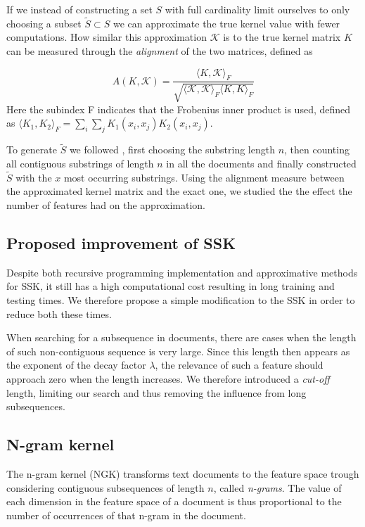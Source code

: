 If we instead of constructing a set $ S $ with full cardinality limit ourselves to only choosing a subset $ \tilde{S} \subset S $ we can approximate the true kernel value with fewer computations. How similar this approximation $ \mathcal{K} $ is to the true kernel matrix $ K $ can be measured through the \textit{alignment} of the two matrices, defined as

\begin{equation}\label{key}
A(K,\mathcal{K}) = \dfrac{\langle K, \mathcal{K}\rangle_{F}}{\sqrt{\langle \mathcal{K}, \mathcal{K}\rangle_{F} \langle K, K\rangle_{F} }}
\end{equation}
Here the subindex F indicates that the Frobenius inner product is used, defined as $ \langle K_1,K_2 \rangle_{F} = \sum_{i}\sum_{j}K_1(x_i,x_j)K_2(x_i,x_j) $.

To generate $ \tilde{S} $ we followed \cite{lodhi}, first choosing the substring length $ n $, then counting all contiguous substrings of length $ n $ in all the documents and finally constructed $ \tilde{S} $ with the $ x $ most occurring substrings. Using the alignment measure between the approximated kernel matrix and the exact one, we studied the the effect the number of features had on the approximation. 

\subsection{Proposed improvement of SSK}
Despite both recursive programming implementation and approximative methods for SSK, it still has a high computational cost resulting in long training and testing times. We therefore propose a simple modification to the SSK in order to reduce both these times. 

When searching for a subsequence in documents, there are cases when the length of such non-contiguous sequence is very large. Since this length then appears as the exponent of the decay factor $ \lambda $, the relevance of such a feature should approach zero when the length increases. We therefore introduced a \textit{cut-off} length, limiting our search and thus removing the influence from long subsequences. 


\subsection{N-gram kernel}
The n-gram kernel (NGK) transforms text documents to the feature space trough considering contiguous subsequences of length $ n $, called \textit{n-grams}. The value of each dimension in the feature space of a document is thus proportional to the number of occurrences of that n-gram in the document. 

